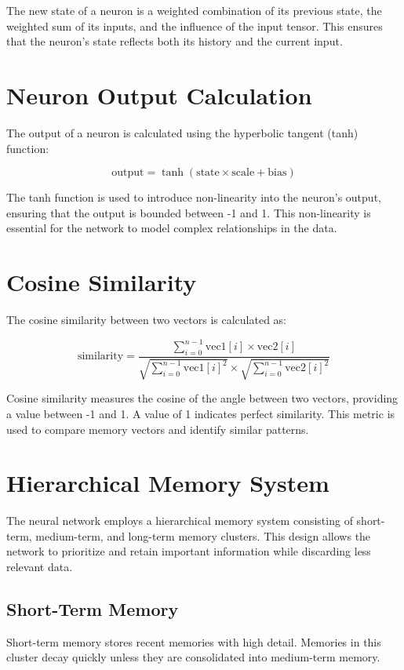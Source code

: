 \documentclass{article}
\begin{document}
The new state of a neuron is a weighted combination of its previous state, the weighted sum of its inputs, and the influence of the input tensor. This ensures that the neuron's state reflects both its history and the current input.

\section{Neuron Output Calculation}
The output of a neuron is calculated using the hyperbolic tangent (tanh) function:

\[
\text{output} = \tanh(\text{state} \times \text{scale} + \text{bias})
\]

The tanh function is used to introduce non-linearity into the neuron's output, ensuring that the output is bounded between -1 and 1. This non-linearity is essential for the network to model complex relationships in the data.

\section{Cosine Similarity}
The cosine similarity between two vectors is calculated as:

\[
\text{similarity} = \frac{\sum_{i=0}^{n-1} \text{vec1}[i] \times \text{vec2}[i]}{\sqrt{\sum_{i=0}^{n-1} \text{vec1}[i]^2} \times \sqrt{\sum_{i=0}^{n-1} \text{vec2}[i]^2}}
\]

Cosine similarity measures the cosine of the angle between two vectors, providing a value between -1 and 1. A value of 1 indicates perfect similarity. This metric is used to compare memory vectors and identify similar patterns.

\section{Hierarchical Memory System}
The neural network employs a hierarchical memory system consisting of short-term, medium-term, and long-term memory clusters. This design allows the network to prioritize and retain important information while discarding less relevant data.

\subsection{Short-Term Memory}
Short-term memory stores recent memories with high detail. Memories in this cluster decay quickly unless they are consolidated into medium-term memory.
\end{document}
